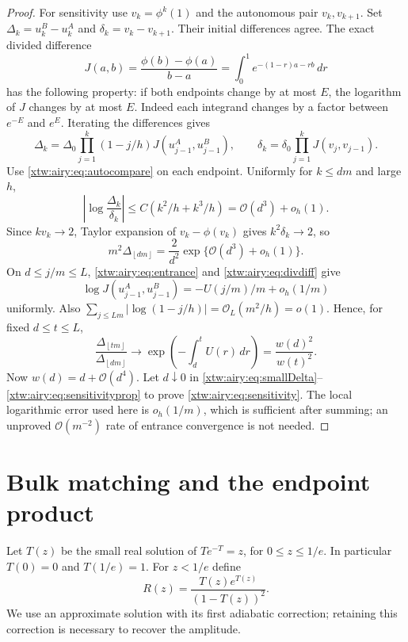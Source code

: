 \documentclass[11pt]{article}
\theoremstyle{remark}\newtheorem{remark}[theorem]{Remark}
\newcommand{\OO}{\mathcal O}
\newcommand{\floor}[1]{\left\lfloor #1\right\rfloor}
\begin{document}
\begin{proof}
For sensitivity use $v_k=\phi^k(1)$ and the autonomous pair $v_k,v_{k+1}$.
Set $\Delta_k=u_k^B-u_k^A$ and $\delta_k=v_k-v_{k+1}$. Their initial
differences agree. The exact divided difference
\begin{equation}\label{xtw:airy:eq:divdiff}
 J(a,b)=\frac{\phi(b)-\phi(a)}{b-a}
       =\int_0^1e^{-(1-r)a-rb}\,dr
\end{equation}
has the following property: if both endpoints change by at most $E$, the
logarithm of $J$ changes by at most $E$. Indeed each integrand changes by a
factor between $e^{-E}$ and $e^E$. Iterating the differences gives
\[
 \Delta_k=\Delta_0\prod_{j=1}^k(1-j/h)J(u_{j-1}^A,u_{j-1}^B),\qquad
 \delta_k=\delta_0\prod_{j=1}^kJ(v_j,v_{j-1}).
\]
Use \eqref{xtw:airy:eq:autocompare} on each endpoint. Uniformly for $k\le dm$ and large
$h$,
\begin{equation}\label{xtw:airy:eq:deltaentry}
 \left|\log\frac{\Delta_k}{\delta_k}\right|
 \le C(k^2/h+k^3/h)=\OO(d^3)+o_h(1).
\end{equation}
Since $kv_k\to2$, Taylor expansion of $v_k-\phi(v_k)$ gives
$k^2\delta_k\to2$, so
\begin{equation}\label{xtw:airy:eq:smallDelta}
 m^2\Delta_{\floor{dm}}=\frac{2}{d^2}
       \exp\{\OO(d^3)+o_h(1)\}.
\end{equation}
On $d\le j/m\le L$, \eqref{xtw:airy:eq:entrance} and \eqref{xtw:airy:eq:divdiff} give
\[
 \log J(u_{j-1}^A,u_{j-1}^B)=-U(j/m)/m+o_h(1/m)
\]
uniformly. Also $\sum_{j\le Lm}|\log(1-j/h)|=\OO_L(m^2/h)=o(1)$.
Hence, for fixed $d\le t\le L$,
\begin{equation}\label{xtw:airy:eq:sensitivityprop}
 \frac{\Delta_{\floor{tm}}}{\Delta_{\floor{dm}}}
 \longrightarrow\exp\!\left(-\int_d^tU(r)\,dr\right)
 =\frac{w(d)^2}{w(t)^2}.
\end{equation}
Now $w(d)=d+\OO(d^4)$. Let $d\downarrow0$ in
\eqref{xtw:airy:eq:smallDelta}--\eqref{xtw:airy:eq:sensitivityprop} to prove
\eqref{xtw:airy:eq:sensitivity}. The local logarithmic error used here is
$o_h(1/m)$, which is sufficient after summing; an unproved $\OO(m^{-2})$
rate of entrance convergence is not needed.
\end{proof}

\section{Bulk matching and the endpoint product}\label{xtw:airy:sec:bulk}
Let $T(z)$ be the small real solution of $Te^{-T}=z$, for $0\le z\le1/e$.
In particular $T(0)=0$ and $T(1/e)=1$. For $z<1/e$ define
\begin{equation}\label{xtw:airy:eq:Rdef}
 R(z)=\frac{T(z)e^{T(z)}}{(1-T(z))^2}.
\end{equation}
We use an approximate solution with its first adiabatic correction; retaining
this correction is necessary to recover the amplitude.
\end{document}
